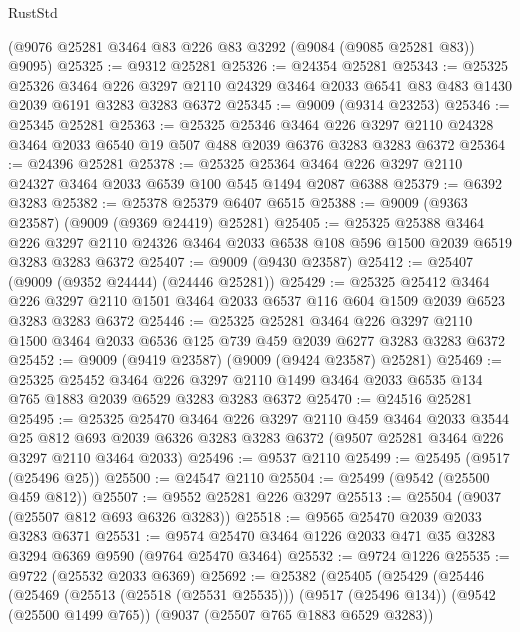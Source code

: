 \begin{lexlean}{RustStd}
\begin{coremodule}
    (@9076 @25281 @3464 @83 @226 @83 @3292 (@9084 (@9085 @25281 @83)) @9095)
@25325 := @9312 @25281
@25326 := @24354 @25281
@25343 := @25325
    @25326
    @3464
    @226
    @3297
    @2110
    @24329
    @3464
    @2033
    @6541
    @83
    @483
    @1430
    @2039
    @6191
    @3283
    @3283
    @6372
@25345 := @9009 (@9314 @23253)
@25346 := @25345 @25281
@25363 := @25325
    @25346
    @3464
    @226
    @3297
    @2110
    @24328
    @3464
    @2033
    @6540
    @19
    @507
    @488
    @2039
    @6376
    @3283
    @3283
    @6372
@25364 := @24396 @25281
@25378 := @25325 @25364 @3464 @226 @3297 @2110 @24327 @3464 @2033 @6539 @100 @545 @1494 @2087 @6388
@25379 := @6392 @3283
@25382 := @25378 @25379 @6407 @6515
@25388 := @9009 (@9363 @23587) (@9009 (@9369 @24419) @25281)
@25405 := @25325
    @25388
    @3464
    @226
    @3297
    @2110
    @24326
    @3464
    @2033
    @6538
    @108
    @596
    @1500
    @2039
    @6519
    @3283
    @3283
    @6372
@25407 := @9009 (@9430 @23587)
@25412 := @25407 (@9009 (@9352 @24444) (@24446 @25281))
@25429 := @25325
    @25412
    @3464
    @226
    @3297
    @2110
    @1501
    @3464
    @2033
    @6537
    @116
    @604
    @1509
    @2039
    @6523
    @3283
    @3283
    @6372
@25446 := @25325
    @25281
    @3464
    @226
    @3297
    @2110
    @1500
    @3464
    @2033
    @6536
    @125
    @739
    @459
    @2039
    @6277
    @3283
    @3283
    @6372
@25452 := @9009 (@9419 @23587) (@9009 (@9424 @23587) @25281)
@25469 := @25325
    @25452
    @3464
    @226
    @3297
    @2110
    @1499
    @3464
    @2033
    @6535
    @134
    @765
    @1883
    @2039
    @6529
    @3283
    @3283
    @6372
@25470 := @24516 @25281
@25495 := @25325
    @25470
    @3464
    @226
    @3297
    @2110
    @459
    @3464
    @2033
    @3544
    @25
    @812
    @693
    @2039
    @6326
    @3283
    @3283
    @6372
    (@9507 @25281 @3464 @226 @3297 @2110 @3464 @2033)
@25496 := @9537 @2110
@25499 := @25495 (@9517 (@25496 @25))
@25500 := @24547 @2110
@25504 := @25499 (@9542 (@25500 @459 @812))
@25507 := @9552 @25281 @226 @3297
@25513 := @25504 (@9037 (@25507 @812 @693 @6326 @3283))
@25518 := @9565 @25470 @2039 @2033 @3283 @6371
@25531 := @9574 @25470 @3464 @1226 @2033 @471 @35 @3283 @3294 @6369 @9590 (@9764 @25470 @3464)
@25532 := @9724 @1226
@25535 := @9722 (@25532 @2033 @6369)
@25692 := @25382
    (@25405
      (@25429
        (@25446
          (@25469
            (@25513 (@25518 (@25531 @25535)))
            (@9517 (@25496 @134))
            (@9542 (@25500 @1499 @765))
            (@9037 (@25507 @765 @1883 @6529 @3283))

\end{coremodule}
\end{lexlean}
